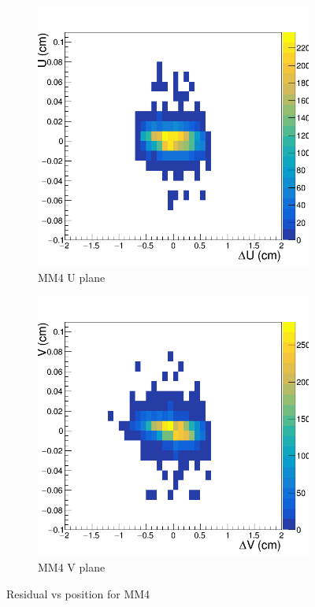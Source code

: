 \begin{figure}[t!]
\begin{subfigure}[l]{.45\textwidth}
  \centering
  \includegraphics[width=\linewidth]{thesis_figures/alignment/Run_3211_T/rotMX4U_after_millepede_T.png}
  \caption{MM4 U plane}
\end{subfigure}
\begin{subfigure}[r]{.45\textwidth}
  \centering
  \includegraphics[width=\linewidth]{thesis_figures/alignment/Run_3211_T/rotMX4V_after_millepede_T.png}
  \caption{MM4 V plane}
\end{subfigure}
\caption{ Residual vs position for MM4}
\end{figure}
